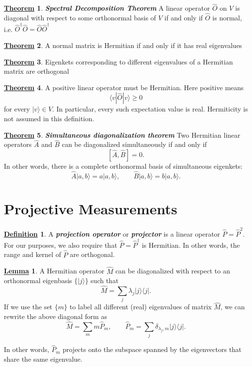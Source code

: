 \documentclass[11pt, answers]{exam}
\theoremstyle{definition}
\newtheorem{definition}{\underline{Definition}}[section]
\newtheorem{theorem}{\underline{Theorem}}[section]
\newtheorem{lemma}{\underline{Lemma}}[section]
\theoremstyle{bulleted}
\begin{document}
	\begin{theorem}
		\textit{\textbf{Spectral Decomposition Theorem}}
		A linear operator \(\hat O\) on \(V\) is diagonal with respect to some orthonormal basis of \(V\) if and only if \(\hat O\) is normal, i.e.
		$\hat O^\dagger\hat O=\hat O\hat O^\dagger$
	\end{theorem}
	
	\begin{theorem}
		A normal matrix is Hermitian if and only if it has real eigenvalues
	\end{theorem}
	
	\begin{theorem}
		Eigenkets corresponding to different eigenvalues of a Hermitian matrix are orthogonal
	\end{theorem}
	
	\begin{theorem}
		A positive linear operator must be Hermitian. Here positive means
		\[
		\langle v|\hat O|v\rangle\geq0
		\]
		for every \(|v\rangle\in V\). In particular, every such expectation value is real. Hermiticity is not assumed in this definition.
	\end{theorem}
	
	\begin{theorem}
		\textbf{\textit{Simultaneous diagonalization theorem}}
		Two Hermitian linear operators \(\hat A\) and \(\hat B\) can be diagonalized simultaneously if and only if
		\[
		\boxed{[\hat A,\hat B]=0.}
		\]
		In other words, there is a complete orthonormal basis of simultaneous eigenkets:
		\[
		\hat A|a,b\rangle=a|a,b\rangle,
		\qquad
		\hat B|a,b\rangle=b|a,b\rangle.
		\tag{1.55}
		\]
	\end{theorem}
	
	\section{Projective Measurements}
	
	\begin{definition}
		A \textit{\textbf{projection operator}} or \textbf{\textit{projector}} is a linear operator $\hat{P}=\hat{P}^2$. For our purposes, we also require that $\hat{P}=\hat{P}^\dagger$ is Hermitian. In other words, the range and kernel of $\hat{P}$ are orthogonal.
	\end{definition}
	
	\begin{lemma}
		A Hermitian operator $\hat{M}$ can be diagonalized with respect to an orthonormal
		eigenbasis $\{|j\rangle\}$ such that
		\[
		\hat{M} = \sum_j \lambda_j |j\rangle\langle j|.
		\]
		If we use the set $\{m\}$ to label all different (real) eigenvalues
		of matrix $\hat{M}$, we can rewrite the above diagonal form as
		\[
		\hat{M} = \sum_m m\hat{P}_m,
		\qquad
		\hat{P}_m = \sum_j \delta_{\lambda_j,m}|j\rangle\langle j|.
		\]
	\end{lemma}
	\noindent In other words, $\hat{P}_m$ projects onto the subspace spanned by the eigenvectors that share the same eigenvalue.
	
\end{document}
